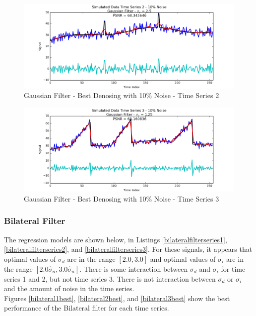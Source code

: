 \documentclass[11pt]{article}
\theoremstyle{definition}
\begin{document}
\begin{figure}
\centering
\includegraphics[width = 0.75 \textwidth]{GaussianSignal2Best.png}
\caption{Gaussian Filter - Best Denosing with 10\% Noise - Time Series 2}
\label{gaussian2best}
\end{figure}

\begin{figure}
\centering
\includegraphics[width = 0.75 \textwidth]{GaussianSignal3Best.png}
\caption{Gaussian Filter - Best Denosing with 10\% Noise - Time Series 3}
\label{gaussian3best}
\end{figure}

\newpage

\subsubsection{Bilateral Filter}

The regression models are shown below, in Listings \ref{bilateralfilterseries1}, \ref{bilateralfilterseries2}, and \ref{bilateralfilterseries3}. For these signals, it appears that optimal values of $\sigma_d$ are in the range $\left[ 2.0, 3.0 \right]$ and optimal values of $\sigma_i$ are in the range $\left[ 2.0 \hat{\sigma}_n, 3.0 \hat{\sigma}_n \right]$. There is some interaction between $\sigma_d$ and $\sigma_i$ for time series 1 and 2, but not time series 3. There is not interaction between $\sigma_d$ or $\sigma_i$ and the amount of noise in the time series.\\

Figures \ref{bilateral1best}, \ref{bilateral2best}, and \ref{bilateral3best} show the best performance of the Bilateral filter for each time series.
\end{document}
